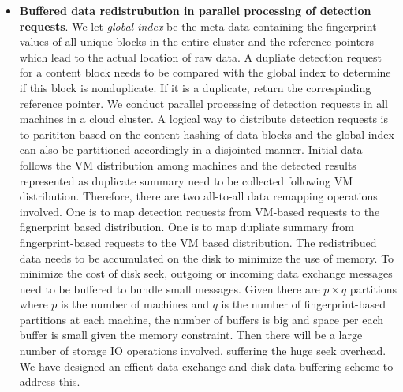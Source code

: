 \begin{itemize}
\item {\bf Buffered data redistrubution in parallel processing of  detection  requests}.  
We let {\em global index} be the meta data containing the fingerprint values of all unique blocks
in the entire cluster and  the reference pointers which lead to the actual location of raw data.
A dupliate detection request for a content block needs to be compared with the global index to determine if this
block is nonduplicate. If it is a duplicate, return the correspinding reference pointer.
We conduct parallel processing of detection requests in all machines in a cloud cluster.
A logical way to distribute detection requests is to parititon based on the content  hashing of data blocks
and the global index can also be partitioned accordingly in a  disjointed manner.
Initial data follows the VM distribution among machines and the detected results 
represented as  duplicate summary need to be collected following VM distribution. 
Therefore, there are two all-to-all data remapping operations involved.
One is to map detection requests from VM-based requests to the fignerprint based distribution.  
One is to map dupliate summary from fingerprint-based requests to the VM based distribution.  
The redistribued data needs to be accumulated on the disk to minimize the use of memory.
To minimize the cost of disk seek, outgoing or incoming data exchange messages need to be buffered to bundle small messages.
Given there are $p\times q$ partitions where $p$ is the number of machines and $q$ is the number of fingerprint-based partitions
at each machine, the number of buffers is big and space per each buffer  is small given the memory constraint.
Then there will be a large number of storage  IO operations involved, suffering the huge seek overhead.
We have designed an effient data exchange and disk data buffering  scheme to address this.


\end{itemize}


